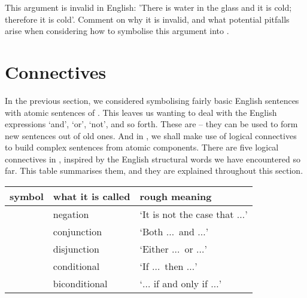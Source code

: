 
\practiceproblems

\problempart This argument is invalid in English: 'There is water in the glass and it is cold; therefore it is cold'. Comment on why it is invalid, and what potential pitfalls arise when considering how to symbolise this argument into \TFL. 


\chapter{Connectives}\label{s:TFLConnectives}
In the previous section, we considered symbolising fairly basic English sentences with atomic sentences of \TFL. This leaves us wanting to deal with the English expressions `and', `or', `not', and so forth. These are  – they can be used to form new sentences out of old ones. And in \TFL, we shall make use of logical connectives to build complex sentences from atomic components. There are five logical connectives in \TFL, inspired by the English structural words we have encountered so far. This table summarises them, and they are explained throughout this section. 

	\begin{table}[h]
	\center
	\begin{tabular}{l l l} \toprule 
	
	\textbf{symbol}&\textbf{what it is called}&\textbf{rough meaning}\\
	\midrule
	\enot&negation&`It is not the case that $…$'\\
	\eand&conjunction&`Both $…$\ and $…$'\\
	\eor&disjunction&`Either $…$\ or $…$'\\
	\eif&conditional&`If $…$\ then $…$'\\
	\eiff&biconditional&`$…$ if and only if $…$'\\
	
	\bottomrule \end{tabular}
	\end{table}

